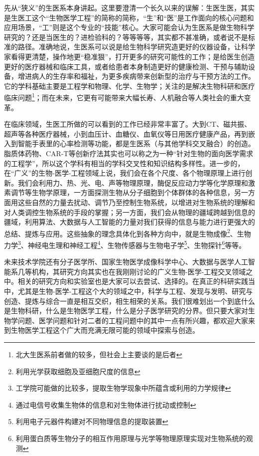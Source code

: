 \documentclass[11pt,oneside]{book}
\begin{document}
先从“狭义”的生医系本身讲起。这里要澄清一个长久以来的误解：生医生医，其实是生医工这个“生物医学工程”的简称的简称，“生”和“医”是工作面向的核心问题和应用场景，“工”则是这个专业的“技能”核心。大家可能会认为生医系是做生物科学研究的？还是当医生的？进检验科的？等等等等，其实都不甚准确，或者说不是标准的路径。准确地说，生医系可以说是给生物科学研究造更好的仪器设备，让科学家看得更清楚，操作地更“稳准狠”，打开更多的研究可能性的工作；是给医生创造更好的医疗器械和临床工具，或者给患者本身制造更好的健康检测、干预与辅助设备，增进病人的生存率和福祉，为更多疾病带来创新型的治疗与干预方法的工作。它的学科基础主要是工程学和物理、化学、生物学；关注的是解决生物科研和医疗临床问题\footnote{北大生医系前者做的较多，但社会上主要谈的是后者}；而在未来，它更有可能带来大幅长寿、人机融合等人类社会的重大变革。

\vspace{10pt}

在临床领域，生医工所做的可以看到的工作已经非常丰富了。大到CT、磁共振、超声等各种医疗器械，小到血压计、血糖仪、血氧仪等日用医疗健康产品，再到嵌入到智能手表里的心率检测等功能，都是生医系（与其他学科交叉融合）的创造。脂质体药物、CAR-T等创新疗法其实也可以称之为一种“针对生物的面向医学需求的工程学”，所以这个学科有相当的学科交叉性和知识结构多样性。进一步的，在“广义”的生物-医学-工程领域上说，我们会在各个尺度、各个物理原理上进行创新。我们会利用力、热、光、电、声等物理原理，酶促反应动力学等化学原理和激素调节等生物学原理，一方面探测生物从分子细胞到个体群体的各种信息，另一方面用这些自然的力量去扰动、调节乃至控制生物系统，以增进对生物系统的理解和对人类调控生物系统的手段的掌握；另一方面，我们会从物理的疆域跨越到信息的疆域，利用算法、大数据与人工智能的力量对我们获得的信息与能力进行更强大的总结、提炼与应用。这些抽象的理念具体化到各种方向中，就是生物成像\footnote{利用光学获取细胞及亚细胞尺度的信息}、生物力学\footnote{工学院可能做的比较多，提取生物学现象中所蕴含或利用的力学规律}、神经电生理和神经工程\footnote{通过电信号收集生物体的信息和对生物体进行扰动或控制}、生物传感器与生物电子学\footnote{利用电子元器件构建对不同物理信息的提取装置}、生物探针\footnote{利用蛋白质等生物分子的相互作用原理与光学等物理原理实现对生物系统的观测}等等。

\vspace{10pt}

未来技术学院还有分子医学所、国家生物医学成像科学中心、大数据与医学人工智能系几等机构，其研究方向其实也在我刚刚讨论的广义生物-医学-工程交叉领域之中。相关的研究方向和实验室也是大家可以去尝试、选择的。在真正的科研实践当中，尤其是生物-医学-工程这个大的领域之中，科学与工程、发现与发明、研究与创造、提炼与综合一直是相互交织，相生相荣的关系。我们很难划出一个到底什么是生物科研，什么是生物医学工程，什么是分子医学研究的分界。但只要大家对生物学问题、医学问题和针对二者的工程问题中的其中一点有所兴趣，都欢迎大家来到生物医学工程这个广大而充满无限可能的领域中探索与创造。
\end{document}
